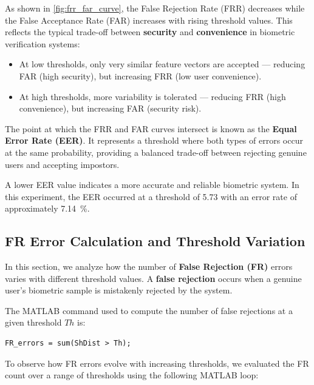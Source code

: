 \documentclass[a4paper,12pt]{article}
\begin{document}
\vspace{0.5em}
\noindent
As shown in \autoref{fig:frr_far_curve}, the False Rejection Rate (FRR) decreases while the False Acceptance Rate (FAR) increases with rising threshold values. This reflects the typical trade-off between \textbf{security} and \textbf{convenience} in biometric verification systems:

\begin{itemize}[noitemsep]
    \item At low thresholds, only very similar feature vectors are accepted — reducing FAR (high security), but increasing FRR (low user convenience).
    \item At high thresholds, more variability is tolerated — reducing FRR (high convenience), but increasing FAR (security risk).
\end{itemize}

\noindent
The point at which the FRR and FAR curves intersect is known as the \textbf{Equal Error Rate (EER)}. It represents a threshold where both types of errors occur at the same probability, providing a balanced trade-off between rejecting genuine users and accepting impostors. 

\vspace{0.5em}
\noindent
A lower EER value indicates a more accurate and reliable biometric system. In this experiment, the EER occurred at a threshold of \SI{5.73}{} with an error rate of approximately \SI{7.14}{\percent}.


\subsection{FR Error Calculation and Threshold Variation}

\noindent
In this section, we analyze how the number of \textbf{False Rejection (FR)} errors varies with different threshold values. A \textbf{false rejection} occurs when a genuine user's biometric sample is mistakenly rejected by the system.

\vspace{0.5em}
\noindent
The MATLAB command used to compute the number of false rejections at a given threshold \( Th \) is:

\begin{verbatim}
FR_errors = sum(ShDist > Th);
\end{verbatim}

\vspace{0.5em}
\noindent
To observe how FR errors evolve with increasing thresholds, we evaluated the FR count over a range of thresholds using the following MATLAB loop:
\end{document}
